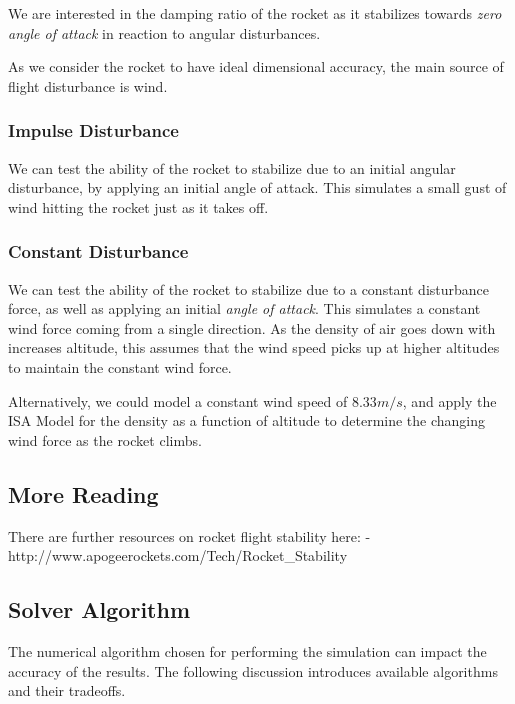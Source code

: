 \documentclass[]{article}
\begin{document}
We are interested in the damping ratio of the rocket as it stabilizes
towards \emph{zero angle of attack} in reaction to angular disturbances.

As we consider the rocket to have ideal dimensional accuracy, the main
source of flight disturbance is wind.

\subsubsection{Impulse Disturbance}\label{impulse-disturbance}

We can test the ability of the rocket to stabilize due to an initial
angular disturbance, by applying an initial angle of attack. This
simulates a small gust of wind hitting the rocket just as it takes off.

\subsubsection{Constant Disturbance}\label{constant-disturbance}

We can test the ability of the rocket to stabilize due to a constant
disturbance force, as well as applying an initial \emph{angle of
attack}. This simulates a constant wind force coming from a single
direction. As the density of air goes down with increases altitude, this
assumes that the wind speed picks up at higher altitudes to maintain the
constant wind force.

Alternatively, we could model a constant wind speed of \(8.33 m/s\), and
apply the ISA Model for the density as a function of altitude to
determine the changing wind force as the rocket climbs.

\subsection{More Reading}\label{more-reading}

There are further resources on rocket flight stability here: -
http://www.apogeerockets.com/Tech/Rocket\_Stability

\subsection{Solver Algorithm}\label{solver-algorithm}

The numerical algorithm chosen for performing the simulation can impact
the accuracy of the results. The following discussion introduces
available algorithms and their tradeoffs.
\end{document}
